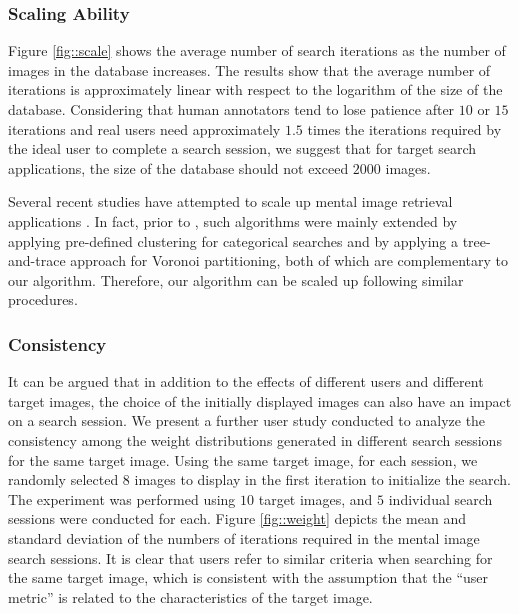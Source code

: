 \documentclass[journal]{IEEEtran}
\begin{document}
\subsubsection{Scaling Ability}
Figure \ref{fig::scale} shows the average number of search iterations as the number of images in the database increases. The results show that the average number of iterations is approximately linear with respect to the logarithm of the size of the database. Considering that human annotators tend to lose patience after $10$ or $15$ iterations and real users need approximately $1.5$ times the iterations required by the ideal user to complete a search session, we suggest that for target search applications, the size of the database should not exceed $2000$ images.

Several recent studies have attempted to scale up mental image retrieval applications \cite{ferecatu2007interactive, suditu2011heat, suditu2012iterative}. In fact, prior to \cite{fang2005experiments}, such algorithms were mainly extended by applying pre-defined clustering for categorical searches and by applying a tree-and-trace approach for Voronoi partitioning,
both of which are complementary to our algorithm. Therefore, our algorithm can be scaled up following similar procedures.

\subsubsection{Consistency}
It can be argued that in addition to the effects of different users and different target images, the choice of the initially displayed images can also have an impact on a search session. We present a further user study conducted to analyze the consistency among the weight distributions generated in different search sessions for the same target image. Using the same target image, for each session, we randomly selected $8$ images to display in the first iteration to initialize the search. The experiment was performed using $10$ target images, and $5$ individual search sessions were conducted for each. Figure \ref{fig::weight} depicts the mean and standard deviation of the numbers of iterations required in the mental image search sessions.
It is clear that users refer to similar criteria when searching for the same target image, which is consistent with the assumption that the ``user metric'' is related to the characteristics of the target image.
\end{document}
